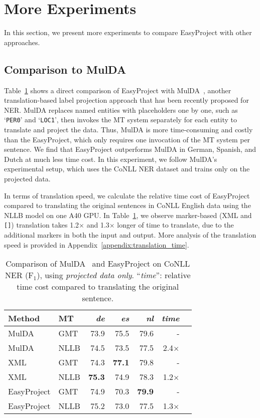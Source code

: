 \documentclass[11pt,dvipsnames]{article}
\begin{document}
\section{More Experiments}
In this section, we present more experiments to compare  EasyProject with other approaches.

\subsection{Comparison to MulDA}
\label{sec:mulda}
Table~\ref{table:MULDA} shows a direct comparison of EasyProject with MulDA~\citep{liu-2021-mulda}, another translation-based label projection approach that has been recently proposed for NER. MulDA replaces named entities with placeholders one by one, such as `\texttt{PER0}' and `\texttt{LOC1}', then invokes the MT system separately for each entity to translate and project the data. 
Thus, MulDA is  more time-consuming and costly than the EasyProject, which only requires one invocation of the MT system per sentence.
We find that EasyProject outperforms MulDA in German, Spanish, and Dutch at much less time cost. In this experiment, we follow MulDA's experimental setup, which uses the CoNLL NER dataset and trains only on the projected data.


In terms of translation speed, we calculate the relative time cost of EasyProject compared to translating the original sentences in CoNLL English data using the NLLB model on one A40 GPU. 
In Table~\ref{table:MULDA}, we observe marker-based (XML and \texttt{[]}) translation takes 1.2$\times$ and 1.3$\times$ longer of time to translate, due to the additional markers in both the input and output.
More analysis of the translation speed  is provided  in Appendix~\ref{appendix:translation_time}.

\renewcommand{\arraystretch}{1.15}
\begin{table}[ht!]
\centering
\small
\vspace{-5pt}
\begin{tabular}{llrrrrr}
\toprule
Method & MT & \textit{de} & \textit{es} & \textit{nl} & \textit{time}\\
\midrule
MulDA & GMT & 73.9 & 75.5 & 79.6 & -\\
MulDA & NLLB & 74.5 & 73.5 & 77.5 &  2.4$\times$\\
\midrule
XML & GMT & 74.3 & \textbf{77.1} & 79.8 &-\\

XML & NLLB & \textbf{75.3} & 74.9 &78.3&1.2$\times$\\
\midrule
EasyProject & GMT & 74.9 &70.3 &\textbf{79.9}&-\\
EasyProject & NLLB & 75.2 &73.0 &77.5 &1.3$\times$\\

\bottomrule
\end{tabular}
\vspace{-5pt}
\caption{Comparison of MulDA~\citep{liu-2021-mulda} and EasyProject on CoNLL NER (F$_1$), using \textit{projected data only}. ``\textit{time}'': relative time cost compared to translating the original sentence.}
\label{table:MULDA}
\vspace{-10pt}
\end{table}
\end{document}
